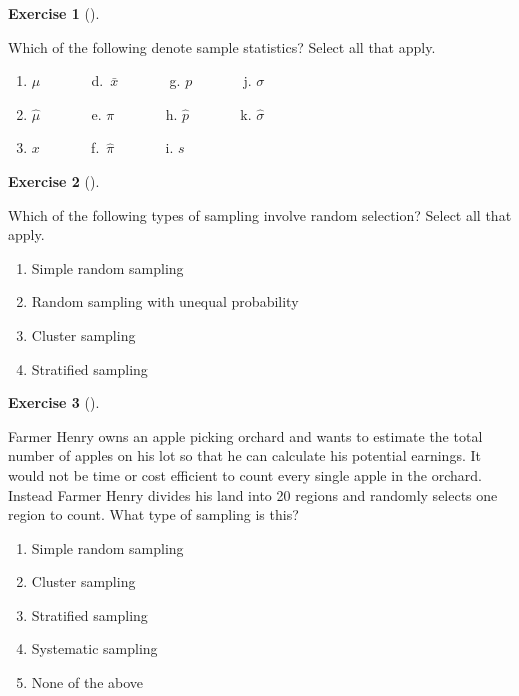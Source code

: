 \documentclass[
  letterpaper,
  DIV=11,
  numbers=noendperiod]{scrreprt}
\providecommand{\tightlist}{%
  \setlength{\itemsep}{0pt}\setlength{\parskip}{0pt}}\usepackage{longtable,booktabs,array}
\theoremstyle{definition}
\newtheorem{exercise}{Exercise}[chapter]
\theoremstyle{remark}
\begin{document}
\begin{exercise}[]\protect\hypertarget{exr-ch08-c02}{}\label{exr-ch08-c02}

Which of the following denote sample statistics? Select all that apply.

\begin{enumerate}
\def\labelenumi{\alph{enumi})}
\tightlist
\item
  \(\mu\) ~ ~ ~ ~ d.~\(\bar{x}\) ~ ~ ~ ~ g. \(p\) ~ ~ ~ ~ j. \(\sigma\)
\item
  \(\hat{\mu}\) ~ ~ ~ ~ e. \(\pi\) ~ ~ ~ ~ h. \(\hat{p}\) ~ ~ ~ ~ k.
  \(\hat{\sigma}\)
\item
  \(x\) ~ ~ ~ ~ f.~\(\hat{\pi}\) ~ ~ ~ ~ i. \(s\)
\end{enumerate}

\end{exercise}

\begin{exercise}[]\protect\hypertarget{exr-ch08-c03}{}\label{exr-ch08-c03}

Which of the following types of sampling involve random selection?
Select all that apply.

\begin{enumerate}
\def\labelenumi{\alph{enumi})}
\tightlist
\item
  Simple random sampling
\item
  Random sampling with unequal probability
\item
  Cluster sampling
\item
  Stratified sampling
\end{enumerate}

\end{exercise}

\begin{exercise}[]\protect\hypertarget{exr-ch08-c04}{}\label{exr-ch08-c04}

Farmer Henry owns an apple picking orchard and wants to estimate the
total number of apples on his lot so that he can calculate his potential
earnings. It would not be time or cost efficient to count every single
apple in the orchard. Instead Farmer Henry divides his land into 20
regions and randomly selects one region to count. What type of sampling
is this?

\begin{enumerate}
\def\labelenumi{\alph{enumi})}
\tightlist
\item
  Simple random sampling
\item
  Cluster sampling
\item
  Stratified sampling
\item
  Systematic sampling
\item
  None of the above
\end{enumerate}

\end{exercise}
\end{document}
